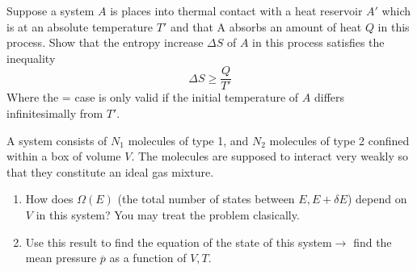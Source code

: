 \documentclass{article}
\begin{document}
    \begin{problem}[Reif 3.4]
        Suppose a system $A$ is places into thermal contact with a heat reservoir $A'$ which is at an absolute temperature $T'$ and that A absorbs an amount of heat $Q$ in this process. Show that the entropy increase $\Delta S$ of $A$ in this process satisfies the inequality $$\Delta S \geq \frac{Q}{T'}$$ Where the = case is only valid if the initial temperature of $A$ differs infinitesimally from $T'$. 
        \answerline
    \end{problem}\newpage
    \begin{problem}[Reif 3.5]
        A system consists of $N_1$ molecules of type 1, and $N_2$ molecules of type 2 confined within a box of volume $V$. The molecules are supposed to interact very weakly so that they constitute an ideal gas mixture. 
        \begin{enumerate}[label=(\alph*)]
            \item How does $\Omega(E)$ (the total number of states between $E,E+\delta E$) depend on $V$ in this system? You may treat the problem clasically. 
            \item Use this result to find the equation of the state of this system$\rightarrow$ find the mean pressure $\overline{p}$ as a function of $V,T$.
        \end{enumerate}
        \answerline
    \end{problem}
\newpage 
\end{document}
